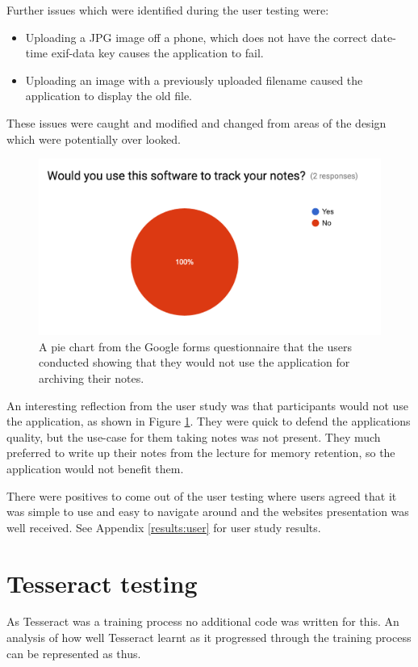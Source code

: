 Further issues which were identified during the user testing were:
\begin{itemize}
  \item Uploading a JPG image off a phone, which does not have the correct date-time exif-data key causes the application to fail.
  \item Uploading an image with a previously uploaded filename caused the application to display the old file.
\end{itemize}

These issues were caught and modified and changed from areas of the design which were potentially over looked.

\begin{figure}[h!]
  \centering
  \includegraphics[scale=0.5]{images/user_response}
  \caption{A pie chart from the Google forms questionnaire \cite{citeulike:14025272} that the users conducted showing that they would not use the application for archiving their notes.}
  \label{fig:user_response}
\end{figure}

An interesting reflection from the user study was that participants would not use the application, as shown in Figure \ref{fig:user_response}. They were quick to defend the applications quality, but the use-case for them taking notes was not present. They much preferred to write up their notes from the lecture for memory retention, so the application would not benefit them.

There were positives to come out of the user testing where users agreed that it was simple to use and easy to navigate around and the websites presentation was well received. See Appendix \ref{results:user} for user study results.

\section{Tesseract testing}
As Tesseract was a training process no additional code was written for this. An analysis of how well Tesseract learnt as it progressed through the training process can be represented as thus.

